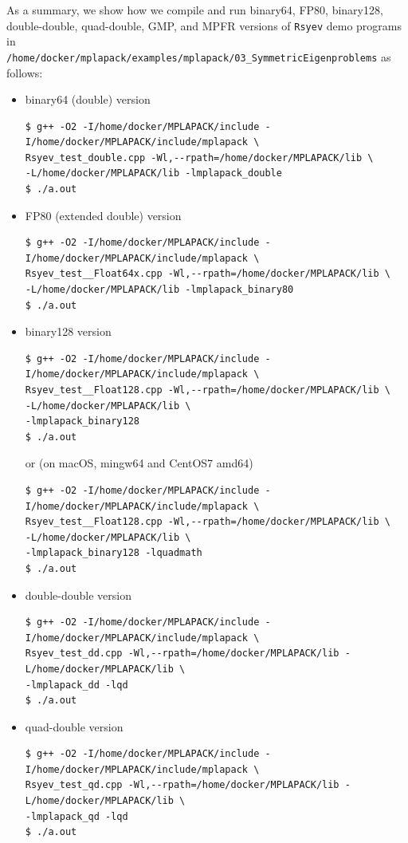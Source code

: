 \documentclass[12pt]{article}
\begin{document}
As a summary, we show how we compile and run binary64, FP80, binary128, double-double, quad-double, GMP, and MPFR versions of {\tt Rsyev} demo programs in \\
{\tt /home/docker/mplapack/examples/mplapack/03\_SymmetricEigenproblems} as follows:
\begin{itemize}
    \item binary64 (double) version
\begin{verbatim}
$ g++ -O2 -I/home/docker/MPLAPACK/include -I/home/docker/MPLAPACK/include/mplapack \
Rsyev_test_double.cpp -Wl,--rpath=/home/docker/MPLAPACK/lib \
-L/home/docker/MPLAPACK/lib -lmplapack_double
$ ./a.out
\end{verbatim}
\item FP80 (extended double) version
\begin{verbatim}
$ g++ -O2 -I/home/docker/MPLAPACK/include -I/home/docker/MPLAPACK/include/mplapack \
Rsyev_test__Float64x.cpp -Wl,--rpath=/home/docker/MPLAPACK/lib \
-L/home/docker/MPLAPACK/lib -lmplapack_binary80
$ ./a.out
\end{verbatim}
\item binary128 version
\begin{verbatim}
$ g++ -O2 -I/home/docker/MPLAPACK/include -I/home/docker/MPLAPACK/include/mplapack \
Rsyev_test__Float128.cpp -Wl,--rpath=/home/docker/MPLAPACK/lib \
-L/home/docker/MPLAPACK/lib \
-lmplapack_binary128
$ ./a.out
\end{verbatim}
or (on macOS, mingw64 and CentOS7 amd64)
\begin{verbatim}
$ g++ -O2 -I/home/docker/MPLAPACK/include -I/home/docker/MPLAPACK/include/mplapack \
Rsyev_test__Float128.cpp -Wl,--rpath=/home/docker/MPLAPACK/lib \
-L/home/docker/MPLAPACK/lib \
-lmplapack_binary128 -lquadmath
$ ./a.out
\end{verbatim}
\item double-double version
\begin{verbatim}
$ g++ -O2 -I/home/docker/MPLAPACK/include -I/home/docker/MPLAPACK/include/mplapack \
Rsyev_test_dd.cpp -Wl,--rpath=/home/docker/MPLAPACK/lib -L/home/docker/MPLAPACK/lib \
-lmplapack_dd -lqd
$ ./a.out
\end{verbatim}
\item quad-double version
\begin{verbatim}
$ g++ -O2 -I/home/docker/MPLAPACK/include -I/home/docker/MPLAPACK/include/mplapack \
Rsyev_test_qd.cpp -Wl,--rpath=/home/docker/MPLAPACK/lib -L/home/docker/MPLAPACK/lib \
-lmplapack_qd -lqd
$ ./a.out
\end{verbatim}

\end{itemize}
\end{document}
